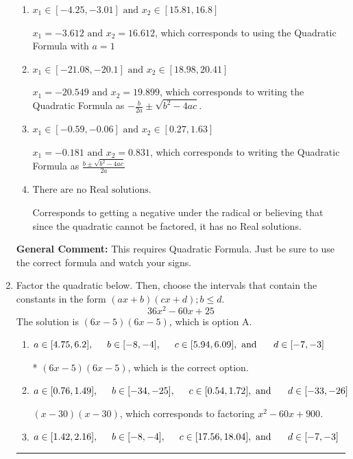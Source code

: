 \documentclass{extbook}[14pt]
\newcommand{\litem}[1]{\item #1

\rule{\textwidth}{0.4pt}}
\begin{document}
\begin{enumerate}
{\begin{enumerate}[label=\Alph*.]
* $x_1 = -0.831 \text{ and } x_2 = 0.181$, which is the correct option.
\item \( x_1 \in [-4.25, -3.01] \text{ and } x_2 \in [15.81, 16.8] \)

 $x_1 = -3.612 \text{ and } x_2 = 16.612$, which corresponds to using the Quadratic Formula with $a=1$
\item \( x_1 \in [-21.08, -20.1] \text{ and } x_2 \in [18.98, 20.41] \)

 $x_1 = -20.549 \text{ and } x_2 = 19.899$, which corresponds to writing the Quadratic Formula as $-\frac{b}{2a} \pm \sqrt{b^2 - 4ac}$.
\item \( x_1 \in [-0.59, -0.06] \text{ and } x_2 \in [0.27, 1.63] \)

 $x_1 = -0.181 \text{ and } x_2 = 0.831$, which corresponds to writing the Quadratic Formula as $\frac{b \pm \sqrt{b^2 - 4ac}}{2a}$
\item \( \text{There are no Real solutions.} \)

Corresponds to getting a negative under the radical or believing that since the quadratic cannot be factored, it has no Real solutions.
\end{enumerate}

\textbf{General Comment:} This requires Quadratic Formula. Just be sure to use the correct formula and watch your signs.
}
\litem{
Factor the quadratic below. Then, choose the intervals that contain the constants in the form $(ax+b)(cx+d); b \leq d.$
\[ 36x^{2} -60 x + 25 \]The solution is \( (6x -5)(6x -5) \), which is option A.\begin{enumerate}[label=\Alph*.]
\item \( a \in [4.75, 6.2], \hspace*{5mm} b \in [-8, -4], \hspace*{5mm} c \in [5.94, 6.09], \text{ and } \hspace*{5mm} d \in [-7, -3] \)

* $(6x -5)(6x -5)$, which is the correct option.
\item \( a \in [0.76, 1.49], \hspace*{5mm} b \in [-34, -25], \hspace*{5mm} c \in [0.54, 1.72], \text{ and } \hspace*{5mm} d \in [-33, -26] \)

 $(x -30)(x -30)$, which corresponds to factoring $x^{2} -60 x + 900$.
\item \( a \in [1.42, 2.16], \hspace*{5mm} b \in [-8, -4], \hspace*{5mm} c \in [17.56, 18.04], \text{ and } \hspace*{5mm} d \in [-7, -3] \)


\end{enumerate}}
\end{enumerate}
\end{document}
